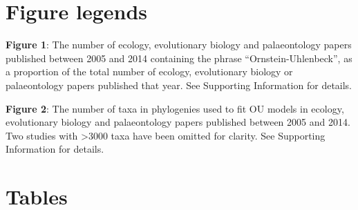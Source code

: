 \documentclass[a4paper,12pt]{article}
\begin{document}
\newpage
\section{Figure legends}

\noindent
\textbf{Figure 1}: The number of ecology, evolutionary biology and palaeontology papers published between 2005 and 2014 containing the phrase ``Ornstein-Uhlenbeck'', as a proportion of the total number of ecology, evolutionary biology or palaeontology papers published that year. See Supporting Information for details.

\noindent
\textbf{Figure 2}: The number of taxa in phylogenies used to fit OU models in ecology, evolutionary biology and palaeontology papers published between 2005 and 2014. Two studies with \textgreater 3000 taxa have been omitted for clarity. See Supporting Information for details.

\newpage
\section{Tables}
\end{document}
